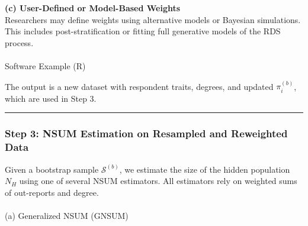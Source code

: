 \documentclass[
  12pt,
  letterpaper,
  DIV=11,
  numbers=noendperiod]{scrartcl}
\makeatletter
\let\oldparagraph\paragraph
\renewcommand{\paragraph}{
    \@ifstar
      \xxxParagraphStar
      \xxxParagraphNoStar
  }
\newcommand{\xxxParagraphStar}[1]{\oldparagraph*{#1}\mbox{}}
\newcommand{\xxxParagraphNoStar}[1]{\oldparagraph{#1}\mbox{}}
\newenvironment{Shaded}{\begin{snugshade}}{\end{snugshade}}
\newcommand{\AttributeTok}[1]{\textcolor[rgb]{0.40,0.45,0.13}{#1}}
\newcommand{\DecValTok}[1]{\textcolor[rgb]{0.68,0.00,0.00}{#1}}
\newcommand{\FunctionTok}[1]{\textcolor[rgb]{0.28,0.35,0.67}{#1}}
\newcommand{\NormalTok}[1]{\textcolor[rgb]{0.00,0.23,0.31}{#1}}
\newcommand{\OtherTok}[1]{\textcolor[rgb]{0.00,0.23,0.31}{#1}}
\newcommand{\SpecialCharTok}[1]{\textcolor[rgb]{0.37,0.37,0.37}{#1}}
\newcommand{\StringTok}[1]{\textcolor[rgb]{0.13,0.47,0.30}{#1}}
\theoremstyle{plain}
\theoremstyle{definition}
\makeatother
\begin{document}
\textbf{(c) User-Defined or Model-Based Weights}\\
Researchers may define weights using alternative models or Bayesian
simulations. This includes post-stratification or fitting full
generative models of the RDS process.

\paragraph{Software Example (R)}\label{software-example-r}

\begin{Shaded}
\end{Shaded}

The output is a new dataset with respondent traits, degrees, and updated
\(\pi_i^{(b)}\), which are used in Step 3.

\begin{center}\rule{0.5\linewidth}{0.5pt}\end{center}

\subsubsection{Step 3: NSUM Estimation on Resampled and Reweighted
Data}\label{step-3-nsum-estimation-on-resampled-and-reweighted-data}

Given a bootstrap sample \(\mathcal{S}^{(b)}\), we estimate the size of
the hidden population \(N_H\) using one of several NSUM estimators. All
estimators rely on weighted sums of out-reports and degree.

\paragraph{(a) Generalized NSUM (GNSUM)}\label{a-generalized-nsum-gnsum}
\end{document}
